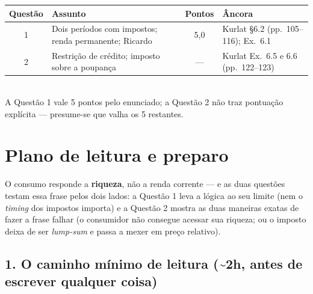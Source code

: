 \documentclass[11pt, a4paper]{article}
\begin{document}
\vspace{4pt}
\begin{center}
\small
\begin{tabular}{clcl}
\toprule
\textbf{Questão} & \textbf{Assunto} & \textbf{Pontos} & \textbf{Âncora} \\
\midrule
1 & Dois períodos com impostos; renda permanente; Ricardo & 5,0 & Kurlat §6.2 (pp.\ 105--116); Ex.\ 6.1 \\
2 & Restrição de crédito; imposto sobre a poupança       & ---  & Kurlat Ex.\ 6.5 e 6.6 (pp.\ 122--123) \\
\bottomrule
\end{tabular}\\[2pt]
{\footnotesize A Questão 1 vale 5 pontos pelo enunciado; a Questão 2 não traz pontuação
explícita --- presume-se que valha os 5 restantes.}
\end{center}

\section[Plano de leitura e preparo]{Plano de leitura e preparo}
\label{sec:plano}

\begin{tcolorbox}[planbox, title={A tese da lista, em uma frase}]
\small
O consumo responde a \textbf{riqueza}, não a renda corrente --- e as duas questões testam
essa frase pelos dois lados: a Questão 1 leva a lógica ao seu limite (nem o
\emph{timing} dos impostos importa) e a Questão 2 mostra as duas maneiras exatas de fazer
a frase falhar (o consumidor não consegue acessar sua riqueza; ou o imposto deixa de ser
\emph{lump-sum} e passa a mexer em preço relativo).
\end{tcolorbox}

\subsection*{1. O caminho mínimo de leitura (\textasciitilde 2h, antes de escrever qualquer coisa)}
\end{document}
